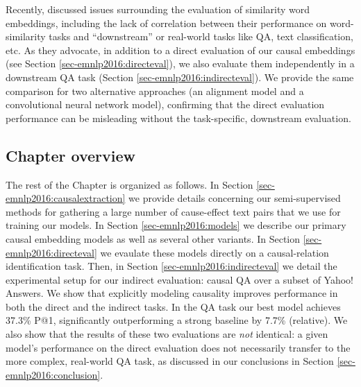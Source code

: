 Recently, \citet{faruqui2016problems} discussed issues surrounding the evaluation of similarity word embeddings, including the lack of correlation between their performance on word-similarity tasks and ``downstream'' or real-world tasks like QA, text classification, etc.  As they advocate, in addition to a direct evaluation of our causal embeddings (see Section \ref{sec-emnlp2016:directeval}), we also evaluate them independently in a downstream QA task (Section \ref{sec-emnlp2016:indirecteval}).  We provide the same comparison for two alternative approaches (an alignment model and a convolutional neural network model), confirming that the direct evaluation performance can be misleading without the task-specific, downstream evaluation.

\subsection{Chapter overview}

The rest of the Chapter is organized as follows.  
In Section \ref{sec-emnlp2016:causalextraction} we provide details concerning our semi-supervised methods for gathering a large number of cause-effect text pairs that we use for training our models.  In Section \ref{sec-emnlp2016:models} we describe our primary causal embedding models as well as several other variants.  In Section \ref{sec-emnlp2016:directeval} we evaulate these models directly on a causal-relation identification task.  Then, in Section \ref{sec-emnlp2016:indirecteval} we detail the experimental setup for our indirect evaluation: causal QA over a subset of Yahoo! Answers.  We show that explicitly modeling causality improves performance in both the direct and the indirect tasks. In the QA task our best model achieves 37.3\% P@1, significantly outperforming a strong baseline by 7.7\% (relative).
We also show that the results of these two evaluations are \emph{not} identical: a given model's performance on the direct evaluation does not necessarily transfer to the more complex, real-world QA task, as discussed in our conclusions in Section \ref{sec-emnlp2016:conclusion}.


